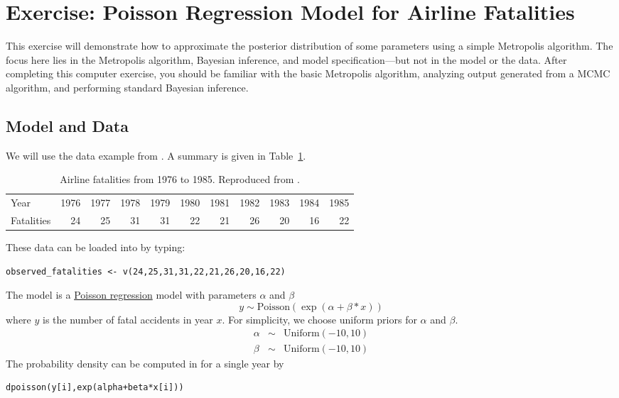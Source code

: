 \newpage
\FloatBarrier
\section{Exercise: Poisson Regression Model for Airline Fatalities}

This exercise will demonstrate how to approximate the posterior distribution of some parameters using a simple Metropolis algorithm. 
The focus here lies in the Metropolis algorithm, Bayesian inference, and model specification---but not in the model or the data. 
After completing this computer exercise, you should be familiar with the basic Metropolis algorithm, analyzing output generated from a MCMC algorithm, and performing standard Bayesian inference.

\subsection{Model and Data}
We will use the data example from \cite{Gelman2003}.
A summary is given in Table~\ref{tab:airlineFatalities}.
\begin{table}[!hbtp]
\caption{Airline fatalities from 1976 to 1985. Reproduced from \cite[][Table~2.2 on p.~69]{Gelman2003}.}
\label{tab:airlineFatalities}
\smallskip
\centering
\begin{tabular}{ l | r r r r r r r r r r }
  \hline                       
  Year & 1976 & 1977 & 1978 & 1979 & 1980 & 1981 & 1982 & 1983 & 1984 & 1985 \\
  Fatalities & 24 & 25 & 31 & 31 & 22 & 21 & 26 & 20 & 16 & 22\\
  \hline  
\end{tabular}
\end{table}

These data can be loaded into \RevBayes by typing:
{\tt \begin{snugshade*}
\begin{lstlisting}    
observed_fatalities <- v(24,25,31,31,22,21,26,20,16,22)
\end{lstlisting}
\end{snugshade*}}

The model is a \href{http://en.wikipedia.org/wiki/Poisson_regression}{Poisson regression} model with parameters $\alpha$ and $\beta$
\begin{equation*}
y \sim \text{Poisson}(\exp(\alpha+\beta*x))
\end{equation*} 
where $y$ is the number of fatal accidents in year $x$. 
For simplicity, we choose uniform priors for $\alpha$ and $\beta$.
\begin{eqnarray*}
\alpha & \sim & \text{Uniform}(-10,10)\\
\beta &  \sim & \text{Uniform}(-10,10)
\end{eqnarray*}
The probability density can be computed in \RevBayes for a single year by
{\tt \begin{snugshade*}
\begin{lstlisting}    
dpoisson(y[i],exp(alpha+beta*x[i]))
\end{lstlisting}
\end{snugshade*}}

